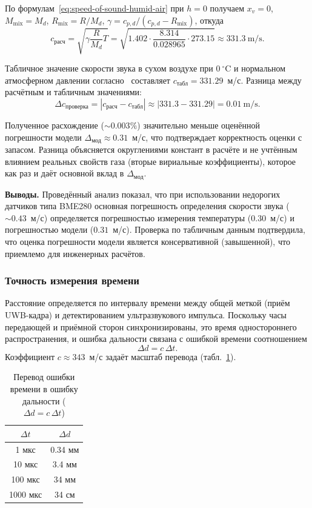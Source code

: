 По формулам~\eqref{eq:speed-of-sound-humid-air} при $h = 0$ получаем $x_v = 0$, $M_{\text{mix}} = M_d$, $R_{\text{mix}} = R/M_d$, $\gamma = c_{p,d}/(c_{p,d} - R_{\text{mix}})$, откуда
\begin{equation}
    c_{\text{расч}} = \sqrt{\gamma \frac{R}{M_d} T} = \sqrt{1.402 \cdot \frac{8.314}{0.028965} \cdot 273.15} \approx 331.3\ \mathrm{m/s}.
\end{equation}

Табличное значение скорости звука в сухом воздухе при $0\ ^\circ\mathrm{C}$ и нормальном атмосферном давлении согласно~\cite{iso2533} составляет $c_{\text{табл}} = 331.29$~м/с. Разница между расчётным и табличным значениями:
\begin{equation}
    \Delta c_{\text{проверка}} = |c_{\text{расч}} - c_{\text{табл}}| \approx |331.3 - 331.29| = 0.01\ \mathrm{m/s}.
\end{equation}

Полученное расхождение ($\sim 0.003\%$) значительно меньше оценённой погрешности модели $\Delta_{\text{мод}} \approx 0.31$~м/с, что подтверждает корректность оценки с запасом. Разница объясняется округлениями констант в расчёте и не учтённым влиянием реальных свойств газа (вторые вириальные коэффициенты), которое как раз и даёт основной вклад в $\Delta_{\text{мод}}$.

\textbf{Выводы.}
Проведённый анализ показал, что при использовании недорогих датчиков типа BME280 основная погрешность определения скорости звука ($\sim 0.43$~м/с) определяется погрешностью измерения температуры ($0.30$~м/с) и погрешностью модели ($0.31$~м/с). Проверка по табличным данным подтвердила, что оценка погрешности модели является консервативной (завышенной), что приемлемо для инженерных расчётов.

\subsubsection{Точность измерения времени}
Расстояние определяется по интервалу времени между общей меткой (приём UWB-кадра) и
детектированием ультразвукового импульса. Поскольку часы передающей и приёмной сторон
синхронизированы, это время одностороннего распространения, и ошибка дальности связана с
ошибкой времени соотношением
\begin{equation}
  \Delta d = c\,\Delta t.
\end{equation}
Коэффициент $c \approx 343$~м/с задаёт масштаб перевода (табл.~\ref{tab:time-scale}).
\begin{table}[h!]
    \centering
    \caption{Перевод ошибки времени в ошибку дальности ($\Delta d = c\,\Delta t$)}
    \label{tab:time-scale}
    \begin{tabular}{|c|c|}
        \hline
        $\Delta t$ & $\Delta d$ \\
        \hline
        1 мкс & 0.34 мм  \\
        10 мкс & 3.4 мм \\
        100 мкс & 34 мм \\
        1000 мкс & 34 см \\
        \hline
    \end{tabular}
\end{table}

